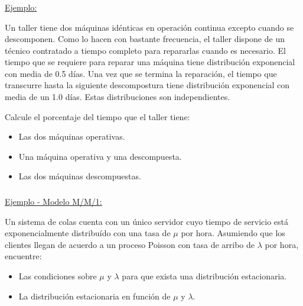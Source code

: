 \documentclass[ 10pt, xcolor = dvipsnames]{beamer}
\begin{document}
\begin{frame}[allowframebreaks]
\frametitle{\insertsubsection}

\underline{Ejemplo:}

Un taller tiene dos m\'aquinas id\'enticas en operaci\'on continua excepto cuando se descomponen. Como lo hacen con bastante frecuencia, el taller dispone de un t\'ecnico contratado a tiempo completo para repararlas cuando es necesario. \linebreak El tiempo que se requiere para reparar una m\'aquina tiene distribuci\'on exponencial con media de 0.5 d\'ias. Una vez que se termina la reparaci\'on, el tiempo que transcurre hasta la siguiente descompostura tiene distribuci\'on exponencial con media de un 1.0 d\'ias. Estas distribuciones son independientes. 

Calcule el porcentaje del tiempo que el taller tiene:
\begin{itemize}
\item Las dos m\'aquinas operativas. 
\item Una m\'aquina operativa y una descompuesta. 
\item Las dos m\'aquinas descompuestas. 
\end{itemize}

\end{frame}

\begin{frame}[allowframebreaks]
\frametitle{\insertsubsection}

\underline{Ejemplo - Modelo M/M/1:}

Un sistema de colas cuenta con un \'unico servidor cuyo tiempo de servicio est\'a exponencialmente distribu\'ido con una tasa de $\mu$ por hora. Asumiendo que los clientes llegan de acuerdo a un proceso Poisson con tasa de arribo de $\lambda$ por hora, encuentre: 
\begin{itemize}
\item Las condiciones sobre $\mu$ y $\lambda$ para que exista una distribuci\'on estacionaria. 
\item La distribuci\'on estacionaria en funci\'on de $\mu$ y $\lambda$. 
\end{itemize}


\end{frame}
\end{document}
